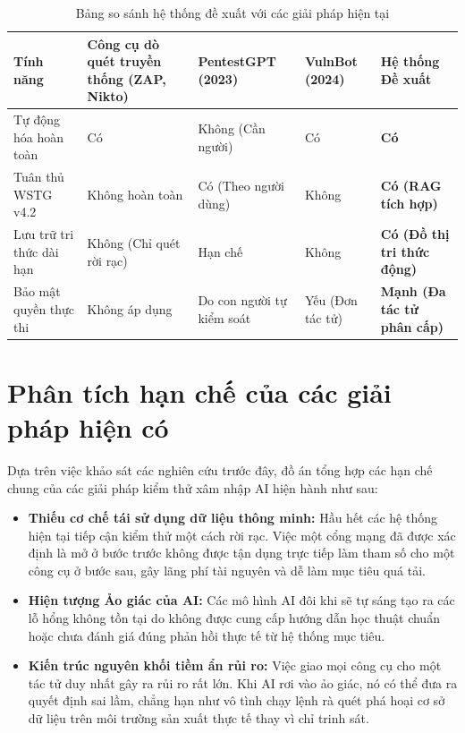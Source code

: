 \begin{table}[h]
\centering
\renewcommand{\arraystretch}{1.3}
\begin{tabular}{|p{3cm}|p{2.5cm}|p{2.5cm}|p{3cm}|p{3cm}|}
\hline
\textbf{Tính năng} & \textbf{Công cụ dò quét truyền thống (ZAP, Nikto)} & \textbf{PentestGPT (2023)} & \textbf{VulnBot (2024)} & \textbf{Hệ thống Đề xuất} \\
\hline
Tự động hóa hoàn toàn & Có & Không (Cần người) & Có & \textbf{Có} \\
\hline
Tuân thủ WSTG v4.2 & Không hoàn toàn & Có (Theo người dùng) & Không & \textbf{Có (RAG tích hợp)} \\
\hline
Lưu trữ tri thức dài hạn & Không (Chỉ quét rời rạc) & Hạn chế & Không & \textbf{Có (Đồ thị tri thức động)} \\
\hline
Bảo mật quyền thực thi & Không áp dụng & Do con người tự kiểm soát & Yếu (Đơn tác tử) & \textbf{Mạnh (Đa tác tử phân cấp)} \\
\hline
\end{tabular}
\caption{Bảng so sánh hệ thống đề xuất với các giải pháp hiện tại}
\end{table}

\section{Phân tích hạn chế của các giải pháp hiện có}
Dựa trên việc khảo sát các nghiên cứu trước đây, đồ án tổng hợp các hạn chế chung của các giải pháp kiểm thử xâm nhập AI hiện hành như sau:
\begin{itemize}
    \item \textbf{Thiếu cơ chế tái sử dụng dữ liệu thông minh:} Hầu hết các hệ thống hiện tại tiếp cận kiểm thử một cách rời rạc. Việc một cổng mạng đã được xác định là mở ở bước trước không được tận dụng trực tiếp làm tham số cho một công cụ ở bước sau, gây lãng phí tài nguyên và dễ làm mục tiêu quá tải.
    \item \textbf{Hiện tượng Ảo giác của AI:} Các mô hình AI đôi khi sẽ tự sáng tạo ra các lỗ hổng không tồn tại do không được cung cấp hướng dẫn học thuật chuẩn hoặc chưa đánh giá đúng phản hồi thực tế từ hệ thống mục tiêu.
    \item \textbf{Kiến trúc nguyên khối tiềm ẩn rủi ro:} Việc giao mọi công cụ cho một tác tử duy nhất gây ra rủi ro rất lớn. Khi AI rơi vào ảo giác, nó có thể đưa ra quyết định sai lầm, chẳng hạn như vô tình chạy lệnh rà quét phá hoại cơ sở dữ liệu trên môi trường sản xuất thực tế thay vì chỉ trinh sát.
\end{itemize}

